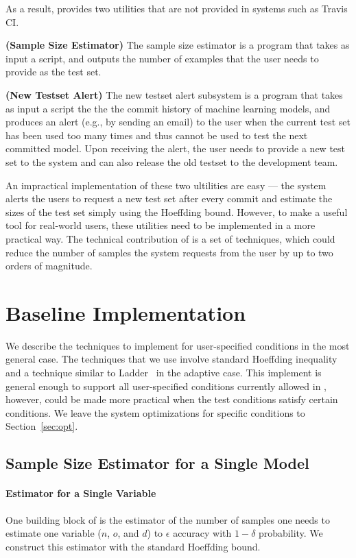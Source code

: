 \documentclass{article}
\begin{document}
As a result, \sys provides two utilities 
that are not provided in systems such as Travis CI.

{\bf (Sample Size Estimator)} The sample size estimator is a program that takes
as input a \sys script, and outputs the number of
examples that the user needs to provide as the test
set. 

{\bf (New Testset Alert)}
The new testset alert subsystem is a program
that takes as input a \sys script the 
the the commit history of machine learning models,
and produces an alert (e.g., by 
sending an email) to the user when the current
test set has been used too many times and thus cannot
be used to test the next committed model.
Upon receiving the alert, the user needs to provide 
a new test set to the system and can also release the old
testset to the development team.


An impractical implementation of these two ultilities
are easy --- the system alerts the users to request
a new test set after every commit and estimate the
sizes of the test set simply using the Hoeffding bound.
However, to make \sys a useful tool for real-world 
users, these utilities need to be implemented in 
a more practical way. The technical contribution of
\sys is a set of techniques, which could reduce 
the number of samples the system requests from the user
by up to two orders of magnitude.

\section{Baseline Implementation}

We describe the techniques to implement 
\sys for user-specified conditions in the
most general case. The techniques that we
use involve standard Hoeffding inequality
and a technique similar to Ladder~\cite{XXX}
in the adaptive case. This implement is
general enough to support all user-specified conditions
currently allowed in \sys, however, could 
be made more practical when the test conditions
satisfy certain conditions. We leave the 
system optimizations for specific conditions
to Section~\ref{sec:opt}.

\subsection{Sample Size Estimator for a Single Model}

\paragraph*{Estimator for a Single Variable}
One building block of \sys is the estimator of
the number of samples one needs to estimate 
one variable ($n$, $o$, and $d$) to $\epsilon$
accuracy with $1-\delta$ probability. We construct
this estimator with the standard Hoeffding bound.
\end{document}
